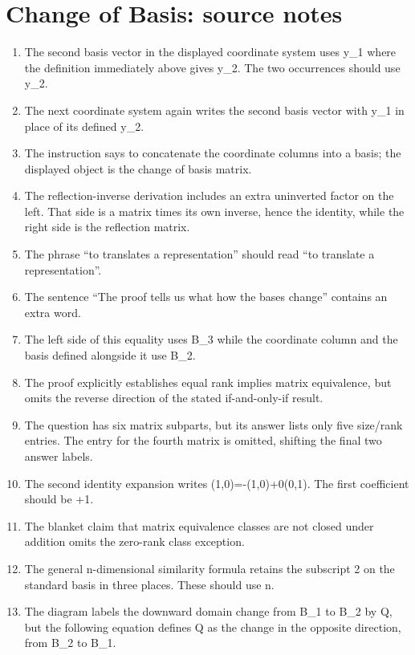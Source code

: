 \section*{Change of Basis: source notes}
\begin{enumerate}
\item The second basis vector in the displayed coordinate system uses y\_1 where the definition immediately above gives y\_2. The two occurrences should use y\_2.
\item The next coordinate system again writes the second basis vector with y\_1 in place of its defined y\_2.
\item The instruction says to concatenate the coordinate columns into a basis; the displayed object is the change of basis matrix.
\item The reflection-inverse derivation includes an extra uninverted factor on the left. That side is a matrix times its own inverse, hence the identity, while the right side is the reflection matrix.
\item The phrase “to translates a representation” should read “to translate a representation”.
\item The sentence “The proof tells us what how the bases change” contains an extra word.
\item The left side of this equality uses B\_3 while the coordinate column and the basis defined alongside it use B\_2.
\item The proof explicitly establishes equal rank implies matrix equivalence, but omits the reverse direction of the stated if-and-only-if result.
\item The question has six matrix subparts, but its answer lists only five size/rank entries. The entry for the fourth matrix is omitted, shifting the final two answer labels.
\item The second identity expansion writes (1,0)=-(1,0)+0(0,1). The first coefficient should be +1.
\item The blanket claim that matrix equivalence classes are not closed under addition omits the zero-rank class exception.
\item The general n-dimensional similarity formula retains the subscript 2 on the standard basis in three places. These should use n.
\item The diagram labels the downward domain change from B\_1 to B\_2 by Q, but the following equation defines Q as the change in the opposite direction, from B\_2 to B\_1.
\end{enumerate}
